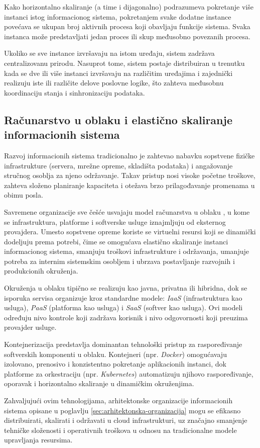 Kako horizontalno skaliranje (a time i dijagonalno) podrazumeva pokretanje više instanci istog informacionog sistema, pokretanjem svake dodatne instance povećava se ukupan broj aktivnih procesa koji obavljaju funkcije sistema. Svaka instanca može predstavljati jedan proces ili skup međusobno povezanih procesa.

Ukoliko se sve instance izvršavaju na istom uređaju, sistem zadržava centralizovanu prirodu. Nasuprot tome, sistem postaje distribuiran u trenutku kada se dve ili više instanci izvršavaju na različitim uređajima i zajednički realizuju iste ili različite delove poslovne logike, što zahteva međusobnu koordinaciju stanja i sinhronizaciju podataka.

\subsection{Računarstvo u oblaku i elastično skaliranje informacionih sistema}
Razvoj informacionih sistema tradicionalno je zahtevao nabavku sopstvene fizičke infrastrukture (servera, mrežne opreme, skladišta podataka) i angažovanje stručnog osoblja za njeno održavanje. Takav pristup nosi visoke početne troškove, zahteva složeno planiranje kapaciteta i otežava brzo prilagođavanje promenama u obimu posla.

Savremene organizacije sve češće usvajaju model računarstva u oblaku  \cite{mell2011nist}, u kome se infrastruktura, platforme i softverske usluge iznajmljuju od eksternog provajdera. Umesto sopstvene opreme koriste se virtuelni resursi koji se dinamički dodeljuju prema potrebi, čime se omogućava elastično skaliranje instanci informacionog sistema, smanjuju troškovi infrastrukture i održavanja, umanjuje potreba za internim sistemskim osobljem i ubrzava postavljanje razvojnih i produkcionih okruženja.

Okruženja u oblaku tipično se realizuju kao javna, privatna ili hibridna, dok se isporuka servisa organizuje kroz standardne modele: \textit{IaaS} (infrastruktura kao usluga), \textit{PaaS} (platforma kao usluga) i \textit{SaaS} (softver kao usluga). Ovi modeli određuju nivo kontrole koji zadržava korisnik i nivo odgovornosti koji preuzima provajder usluge.

Kontejnerizacija predstavlja dominantan tehnološki pristup za raspoređivanje softverskih komponenti u oblaku. Kontejneri (npr. \textit{Docker}) omogućavaju izolovano, prenosivo i konzistentno pokretanje aplikacionih instanci, dok platforme za orkestraciju (npr. \textit{Kubernetes}) automatizuju njihovo raspoređivanje, oporavak i horizontalno skaliranje u dinamičkim okruženjima.

Zahvaljujući ovim tehnologijama, arhitektonske organizacije informacionih sistema opisane u poglavlju \ref{sec:arhitektonska-organizacija} mogu se efikasno distribuirati, skalirati i održavati u cloud infrastrukturi, uz značajno smanjenje tehničke složenosti i operativnih troškova u odnosu na tradicionalne modele upravljanja resursima.